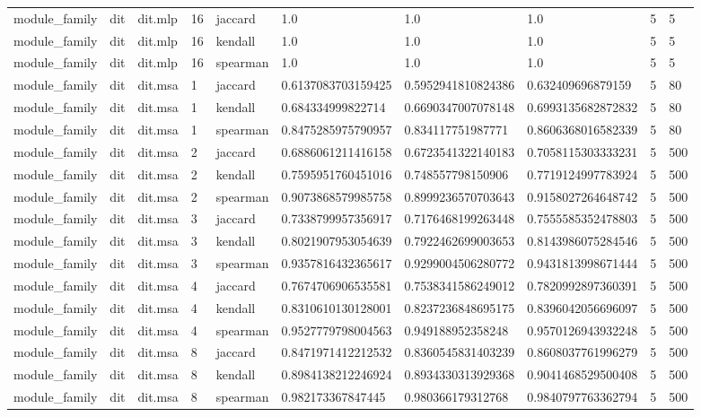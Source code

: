 \begin{tabular}{llllllllll}
module\_family & dit & dit.mlp & 16 & jaccard & 1.0 & 1.0 & 1.0 & 5 & 5 \\
module\_family & dit & dit.mlp & 16 & kendall & 1.0 & 1.0 & 1.0 & 5 & 5 \\
module\_family & dit & dit.mlp & 16 & spearman & 1.0 & 1.0 & 1.0 & 5 & 5 \\
module\_family & dit & dit.msa & 1 & jaccard & 0.6137083703159425 & 0.5952941810824386 & 0.632409696879159 & 5 & 80 \\
module\_family & dit & dit.msa & 1 & kendall & 0.684334999822714 & 0.6690347007078148 & 0.6993135682872832 & 5 & 80 \\
module\_family & dit & dit.msa & 1 & spearman & 0.8475285975790957 & 0.834117751987771 & 0.8606368016582339 & 5 & 80 \\
module\_family & dit & dit.msa & 2 & jaccard & 0.6886061211416158 & 0.6723541322140183 & 0.7058115303333231 & 5 & 500 \\
module\_family & dit & dit.msa & 2 & kendall & 0.7595951760451016 & 0.748557798150906 & 0.7719124997783924 & 5 & 500 \\
module\_family & dit & dit.msa & 2 & spearman & 0.9073868579985758 & 0.8999236570703643 & 0.9158027264648742 & 5 & 500 \\
module\_family & dit & dit.msa & 3 & jaccard & 0.7338799957356917 & 0.7176468199263448 & 0.7555585352478803 & 5 & 500 \\
module\_family & dit & dit.msa & 3 & kendall & 0.8021907953054639 & 0.7922462699003653 & 0.8143986075284546 & 5 & 500 \\
module\_family & dit & dit.msa & 3 & spearman & 0.9357816432365617 & 0.9299004506280772 & 0.9431813998671444 & 5 & 500 \\
module\_family & dit & dit.msa & 4 & jaccard & 0.7674706906535581 & 0.7538341586249012 & 0.7820992897360391 & 5 & 500 \\
module\_family & dit & dit.msa & 4 & kendall & 0.8310610130128001 & 0.8237236848695175 & 0.8396042056696097 & 5 & 500 \\
module\_family & dit & dit.msa & 4 & spearman & 0.9527779798004563 & 0.949188952358248 & 0.9570126943932248 & 5 & 500 \\
module\_family & dit & dit.msa & 8 & jaccard & 0.8471971412212532 & 0.8360545831403239 & 0.8608037761996279 & 5 & 500 \\
module\_family & dit & dit.msa & 8 & kendall & 0.8984138212246924 & 0.8934330313929368 & 0.9041468529500408 & 5 & 500 \\
module\_family & dit & dit.msa & 8 & spearman & 0.982173367847445 & 0.980366179312768 & 0.9840797763362794 & 5 & 500 \\

\end{tabular}
